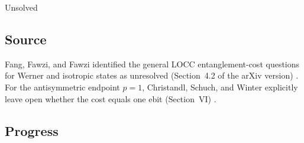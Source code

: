 Unsolved

\subsection*{Source}

Fang, Fawzi, and Fawzi identified the general LOCC entanglement-cost
questions for Werner and isotropic states as unresolved
(Section~4.2 of the arXiv version) .  For the antisymmetric
endpoint $p=1$, Christandl, Schuch, and Winter explicitly leave open whether
the cost equals one ebit (Section~VI)
.

\subsection*{Progress}

